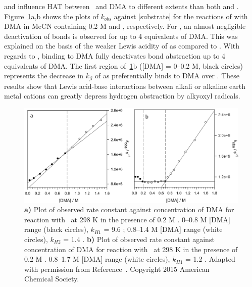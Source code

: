  and  influence HAT between \cumo\ and DMA to different extents than both  and . Figure~\ref{fig:k-metals-naca}a,b shows the plots of $k_{obs}$ against [substrate] for the reactions of \cumo with DMA in MeCN containing 0.2 M  and , respectively. For , an almost negligible deactivation of  bonds is observed for up to 4 equivalents of DMA. This was explained on the basis of the weaker Lewis acidity of  as compared to . With regards to , binding to DMA fully deactivates  bond abstraction up to 4 equivalents of DMA. The first region of~\ref{fig:k-metals-naca}b ([DMA] = 0--0.2 M, black circles) represents the decrease in $k_\beta$ of \cumo as  preferentially binds to DMA over \cumo. These results show that Lewis acid-base interactions between alkali or alkaline earth metal cations can greatly depress hydrogen abstraction by alkyoxyl radicals.

\begin{figure}[!htbp]
  \includegraphics[width=\textwidth]{figures/exptdma-na-ca.png}
  \caption[Plot of observed rate constant against concentration of DMA for reaction with \cumo\ at 298 K in the presence of 0.2 M  and .]
  {\textbf{a)} Plot of observed rate constant against concentration of DMA for reaction with \cumo\ at 298 K in the presence of 0.2 M . 0--0.8 M [DMA] range (black circles), $k_{H1}$ = 9.6 \Ms; 0.8--1.4 M [DMA] range (white circles), $k_{H2}$ = 1.4 \Ms.
  \textbf{b)} Plot of observed rate constant against concentration of DMA for reaction with \cumo\ at 298 K in the presence of 0.2 M . 0.8--1.7 M [DMA] range (white circles), $k_{H1}$ = 1.2 \Ms. Adapted with permission from Reference~\protect{}. Copyright 2015 American Chemical Society.}
  \label{fig:k-metals-naca}
\end{figure}

